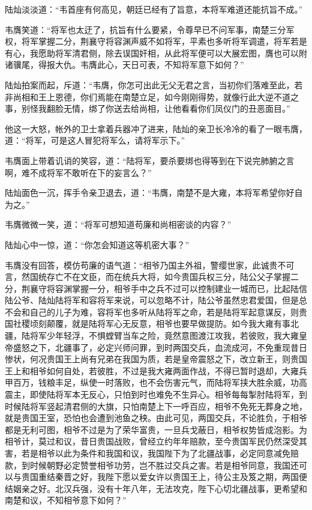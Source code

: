 陆灿淡淡道：“韦首座有何高见，朝廷已经有了旨意，本将军难道还能抗旨不成。”

韦膺笑道：“将军也太迂了，抗旨有什么要紧，令尊早已不问军事，南楚三分军权，将军掌握二分，荆襄守将容渊声威不如将军，平素也多听将军调遣，将军若是有心，我愿助将军清君侧，除去误国奸相，从此将军便可以大展宏图，膺也可以附诸骥尾，得报大仇。韦膺此心，天日可表，不知将军意下如何？”

陆灿拍案而起，斥道：“韦膺，你怎可出此无父无君之言，当初你们落难至此，若非尚相和王上恩德，你们焉能在南楚立足，如今刚刚得势，就像行此大逆不道之事，别怪我翻脸无情，绑了你送去给尚相，让他看看你们凤仪门的丑恶面目。”

他这一大怒，帐外的卫士拿着兵器冲了进来，陆灿的亲卫长冷冷的看了一眼韦膺，道：“将军，可是这人冒犯将军么，请将军示下。”

韦膺面上带着讥诮的笑容，道：“陆将军，要杀要绑也得等到在下说完肺腑之言啊，难不成将军不敢听在下的妄言么？”

陆灿面色一沉，挥手令亲卫退去，道：“韦膺，南楚不是大雍，本将军希望你好自为之。”

韦膺微微一笑，道：“将军可想知道苟廉和尚相密谈的内容？”

陆灿心中一惊，道：“你怎会知道这等机密大事？”

韦膺没有回答，模仿苟廉的语气道：“相爷乃国主外祖，警缨世家，此诚贵不可言，然国统存亡不在文臣，而在统兵大将，如今贵国兵权三分，陆公父子掌握二分，荆襄守将容渊掌握一分，相爷手中之兵不过可以控制建业一城而已，比起陆信陆公爷、陆灿陆将军和容将军来说，可以忽略不计，陆公爷虽然忠君爱国，但是总不会和自己的儿子为难，容将军也多听从陆将军之命，若是陆将军起意谋反，则贵国社稷顷刻颠覆，就是陆将军心无反意，相爷也要早做提防。如今我大雍有事北疆，陆将军少年轻浮，不惧螳臂当车之险，竟然意图渡江攻我，若彼败，我大雍皇帝盛怒之下，北疆事了，必定兴师问罪，到时两国交兵，血流成河，不免重现昔日惨状，何况贵国王上尚有兄弟在我国为质，若是皇帝震怒之下，改立新王，则贵国王上和相爷如何自处，若彼胜，不过是我大雍两面作战，不得已暂时退却，大雍兵甲百万，钱粮丰足，纵使一时落败，也不会伤害元气，而陆将军挟大胜余威，功高震主，即使陆将军本无反心，只怕到时也难免不生异心。相爷每每掣肘陆将军，到时候陆将军竖起清君侧的大旗，只怕南楚上下一呼百应，相爷不免死无葬身之地，就是贵国王室，恐怕也会遭到池鱼之秧。由此可见，两国交兵，不论胜负，于相爷都是无利可图，相爷不过是为了荣华富贵，一旦兵戈蔽日，相爷权势皆成泡影。为相爷计，莫过和议，昔日贵国战败，曾经立约年年赔款，至今贵国军民仍然深受其害，若是相爷以此为条件和我国和议，我国陛下为了北疆战事，必定同意减免赔款，到时候朝野必定赞誉相爷功劳，岂不胜过交兵之害。若是相爷同意，我国还可以与贵国重结秦晋之好，我陛下愿以爱女许以贵国王上，待公主及笈之期，两国便结姻亲之好。北汉兵强，没有十年八年，无法攻克，陛下心切北疆战事，更希望和南楚和议，不知相爷意下如何？”

